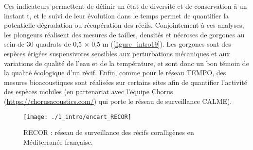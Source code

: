 Ces indicateurs permettent de définir un état de diversité et de conservation à un instant t, et le suivi de leur évolution dans le temps permet de quantifier la potentielle dégradation ou récupération des récifs. Conjointement à ces analyses, les plongeurs réalisent des mesures de tailles, densités et nécroses de gorgones au sein de 30 quadrats de 0,5 $\times$ 0,5 m (\autoref{figure_intro19}). Les gorgones sont des espèces érigées suspensivores sensibles aux perturbations mécaniques et aux variations de qualité de l’eau et de la température, et sont donc un bon témoin de la qualité écologique d’un récif. Enfin, comme pour le réseau TEMPO, des mesures bioacoustiques sont réalisées sur certains sites afin de quantifier l’activité des espèces mobiles (en partenariat avec l’équipe Chorus (\href{https://chorusacoustics.com/}{https://chorusacoustics.com/}) qui porte le réseau de surveillance CALME).

\medskip

\setlength{\fboxsep}{5pt}
\setlength{\fboxrule}{0.6pt}
\noindent{}

\begin{sidewaysfigure}
\begin{figure}[H]
	\begin{center}
	\texttt{[image: ./1\_intro/encart\_RECOR]}
		\caption[RECOR : réseau de surveillance des récifs coralligènes en Méditerranée française]{RECOR : réseau de surveillance des récifs coralligènes en Méditerranée française.}
	\label{figure_intro19}
\end{center}
\end{figure}
\end{sidewaysfigure}

\newpage

